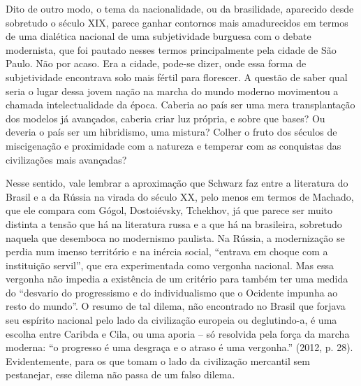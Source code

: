 Dito de outro modo, o tema da nacionalidade, ou da brasilidade,
aparecido desde sobretudo o século XIX, parece ganhar contornos mais
amadurecidos em termos de uma dialética nacional de uma subjetividade
burguesa com o debate modernista, que foi pautado nesses termos
principalmente pela cidade de São Paulo. Não por acaso. Era a cidade,
pode-se dizer, onde essa forma de subjetividade encontrava solo mais
fértil para florescer. A questão de saber qual seria o lugar dessa jovem
nação na marcha do mundo moderno movimentou a chamada intelectualidade
da época. Caberia ao país ser uma mera transplantação dos modelos já
avançados, caberia criar luz própria, e sobre que bases? Ou deveria o
país ser um hibridismo, uma mistura? Colher o fruto dos séculos de
miscigenação e proximidade com a natureza e temperar com as conquistas
das civilizações mais avançadas?

Nesse sentido, vale lembrar a aproximação que Schwarz faz entre a
literatura do Brasil e a da Rússia na virada do século XX, pelo menos em
termos de Machado, que ele compara com Gógol, Dostoiévsky, Tchekhov, já
que parece ser muito distinta a tensão que há na literatura russa e a
que há na brasileira, sobretudo naquela que desemboca no modernismo
paulista. Na Rússia, a modernização se perdia num imenso território e na
inércia social, ``entrava em choque com a instituição servil'', que era
experimentada como vergonha nacional. Mas essa vergonha não impedia a
existência de um critério para também ter uma medida do ``desvario do
progressismo e do individualismo que o Ocidente impunha ao resto do
mundo''. O resumo de tal dilema, não encontrado no Brasil que forjava
seu espírito nacional pelo lado da civilização europeia ou deglutindo-a,
é uma escolha entre Caribda e Cila, ou uma aporia -- só resolvida pela
força da marcha moderna: ``o progresso é uma desgraça e o atraso é uma
vergonha.'' (2012, p. 28). Evidentemente, para os que tomam o lado da
civilização mercantil sem pestanejar, esse dilema não passa de um falso
dilema.


